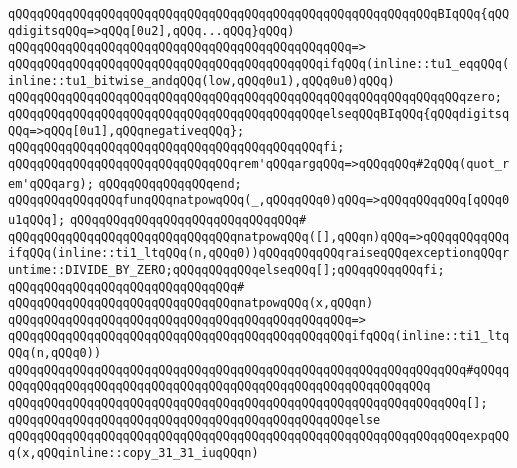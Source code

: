 \verb|qQQqqQQqqQQqqQQqqQQqqQQqqQQqqQQqqQQqqQQqqQQqqQQqqQQqqQQqqQQqBIqQQq{qQQqdigitsqQQq=>qQQq[0u2],qQQq...qQQq}qQQq)|\newline
\verb|qQQqqQQqqQQqqQQqqQQqqQQqqQQqqQQqqQQqqQQqqQQqqQQq=>|\newline
\verb|qQQqqQQqqQQqqQQqqQQqqQQqqQQqqQQqqQQqqQQqqQQqifqQQq(inline::tu1_eqqQQq(inline::tu1_bitwise_andqQQq(low,qQQq0u1),qQQq0u0)qQQq)|\newline
\verb|qQQqqQQqqQQqqQQqqQQqqQQqqQQqqQQqqQQqqQQqqQQqqQQqqQQqqQQqqQQqqQQqzero;|\newline
\verb|qQQqqQQqqQQqqQQqqQQqqQQqqQQqqQQqqQQqqQQqqQQqelseqQQqBIqQQq{qQQqdigitsqQQq=>qQQq[0u1],qQQqnegativeqQQq};|\newline
\verb|qQQqqQQqqQQqqQQqqQQqqQQqqQQqqQQqqQQqqQQqqQQqfi;|\newline
\newline
\verb|qQQqqQQqqQQqqQQqqQQqqQQqqQQqqQQqrem'qQQqargqQQq=>qQQqqQQq#2qQQq(quot_rem'qQQqarg);|\newline
\verb|qQQqqQQqqQQqqQQqend;|\newline
\newline
\verb|qQQqqQQqqQQqqQQqfunqQQqnatpowqQQq(_,qQQqqQQq0)qQQq=>qQQqqQQqqQQq[qQQq0u1qQQq];|\newline
\verb|qQQqqQQqqQQqqQQqqQQqqQQqqQQqqQQq#|\newline
\verb|qQQqqQQqqQQqqQQqqQQqqQQqqQQqqQQqnatpowqQQq([],qQQqn)qQQq=>qQQqqQQqqQQqifqQQq(inline::ti1_ltqQQq(n,qQQq0))qQQqqQQqqQQqraiseqQQqexceptionqQQqruntime::DIVIDE_BY_ZERO;qQQqqQQqqQQqelseqQQq[];qQQqqQQqqQQqfi;|\newline
\verb|qQQqqQQqqQQqqQQqqQQqqQQqqQQqqQQq#|\newline
\verb|qQQqqQQqqQQqqQQqqQQqqQQqqQQqqQQqnatpowqQQq(x,qQQqn)|\newline
\verb|qQQqqQQqqQQqqQQqqQQqqQQqqQQqqQQqqQQqqQQqqQQqqQQq=>|\newline
\verb|qQQqqQQqqQQqqQQqqQQqqQQqqQQqqQQqqQQqqQQqqQQqqQQqifqQQq(inline::ti1_ltqQQq(n,qQQq0))|\newline
\verb|qQQqqQQqqQQqqQQqqQQqqQQqqQQqqQQqqQQqqQQqqQQqqQQqqQQqqQQqqQQqqQQq#qQQqqQQqqQQqqQQqqQQqqQQqqQQqqQQqqQQqqQQqqQQqqQQqqQQqqQQqqQQqqQQq|\newline
\verb|qQQqqQQqqQQqqQQqqQQqqQQqqQQqqQQqqQQqqQQqqQQqqQQqqQQqqQQqqQQqqQQq[];|\newline
\verb|qQQqqQQqqQQqqQQqqQQqqQQqqQQqqQQqqQQqqQQqqQQqqQQqelse|\newline
\verb|qQQqqQQqqQQqqQQqqQQqqQQqqQQqqQQqqQQqqQQqqQQqqQQqqQQqqQQqqQQqqQQqexpqQQq(x,qQQqinline::copy_31_31_iuqQQqn)|\newline
